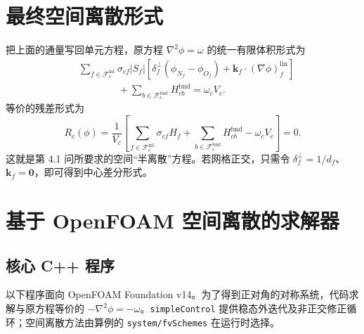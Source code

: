 \documentclass[UTF8,a4paper,11pt]{ctexart}
\newcommand{\vect}[1]{\bm{#1}}
\newcommand{\kf}{\vect k_f}
\begin{document}
\section{最终空间离散形式}

把上面的通量写回单元方程，原方程 \(\nabla^2\phi=\omega\) 的统一有限体积形式为
\begin{equation}
\boxed{
\begin{aligned}
  &\sum_{f\in\mathcal F_c^{\mathrm{int}}}
  \sigma_{cf}
  |S_f|\left[
  \delta_f^{\perp}(\phi_{N_f}-\phi_{O_f})
  +\kf\cdot(\nabla\phi)_f^{\mathrm{lin}}
  \right]\\
  &\hspace{4em}+
  \sum_{b\in\mathcal F_c^{\mathrm{bnd}}}
  H_{cb}^{\mathrm{bnd}}
  =\omega_cV_c .
\end{aligned}}
\label{eq:finaldiscrete}
\end{equation}
等价的残差形式为
\begin{equation}
\boxed{
  R_c(\phi)=\frac{1}{V_c}
  \left[
  \sum_{f\in\mathcal F_c^{\mathrm{int}}}\sigma_{cf}H_f
  +\sum_{b\in\mathcal F_c^{\mathrm{bnd}}}H_{cb}^{\mathrm{bnd}}
  -\omega_cV_c
  \right]=0.}
\label{eq:finalres}
\end{equation}
这就是第 4.1 问所要求的空间“半离散”方程。若网格正交，只需令
\(\delta_f^{\perp}=1/d_f\)、\(\kf=\vect0\)，即可得到中心差分形式。

\section{基于 OpenFOAM 空间离散的求解器}

\subsection{核心 C++ 程序}

以下程序面向 OpenFOAM Foundation v14。为了得到正对角的对称系统，代码求解与原方程等价的
\(-\nabla^2\phi=-\omega\)。\texttt{simpleControl} 提供稳态外迭代及非正交修正循环；空间离散方法由算例的 \texttt{system/fvSchemes} 在运行时选择。
\end{document}
